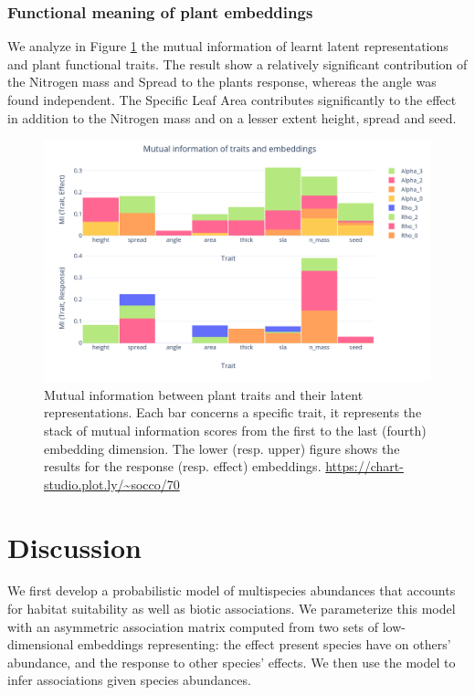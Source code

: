 \documentclass[]{article}
\newcommand{\commG}[1]{#1}
\begin{document}
\subsubsection{Functional meaning of plant embeddings}
We analyze in Figure \ref{mitraitemb} the mutual information of learnt latent representations and plant functional traits. The result show a relatively significant contribution of the Nitrogen mass and Spread to the plants response, whereas the angle was found independent. The Specific Leaf Area contributes significantly to the effect in addition to the Nitrogen mass and on a lesser extent height, spread and seed. \\  

\begin{figure}[h]
	\commG{\includegraphics[scale=0.25]{mi_trait_embeddings}}
	\caption{Mutual information between plant traits and their latent representations. Each bar concerns a specific trait, it represents the stack of mutual information scores from the first to the last (fourth) embedding dimension. The lower (resp. upper) figure shows the results for the response (resp. effect) embeddings. \url{https://chart-studio.plot.ly/~socco/70}} \label{mitraitemb}
\end{figure}

\section{Discussion}
We first develop a probabilistic model of multispecies abundances that accounts for habitat suitability as well as biotic associations. We parameterize this model with an asymmetric association matrix computed from two sets of low-dimensional embeddings representing: the effect present species have on others' abundance, and the response to other species' effects. We then use the model to infer associations given species abundances. 
\end{document}
